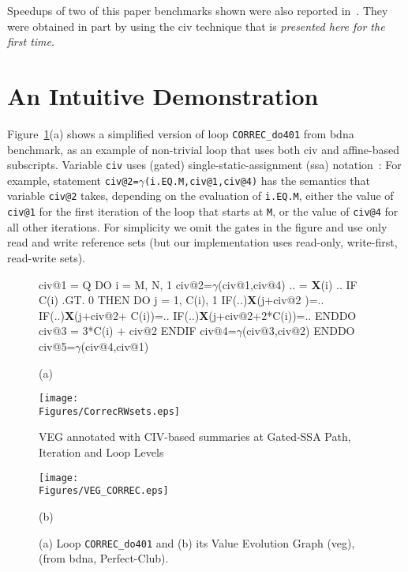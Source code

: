 \documentclass[10pt,nocopyrightspace]{sigplanconf}
\newcommand{\mymath}[1]{$ #1 $}
\newcommand{\Figures}[1]{../Figures/}
\begin{document}
Speedups of two of this paper benchmarks shown were also reported 
in~\cite{CosPLDI}. They were obtained in part by using the {\sc civ} 
technique that is {\em presented here for the first time}.


\section{An Intuitive Demonstration}
\label{Intro:RelAppLim}

Figure~\ref{fig:codeActforCorrec}(a) shows a simplified version of
loop {\tt CORREC\_do401} from {\sc bdna} benchmark, 
as an example of non-trivial loop that uses both {\sc civ} and affine-based
subscripts.   Variable {\tt civ}  uses (gated) 
single-static-assignment ({\sc ssa}) notation~\cite{GatedSSA}: 
%
For example, statement {\tt civ@2=$\gamma$(i.EQ.M,civ@1,civ@4)}
has the semantics that variable {\tt civ@2} takes, depending 
on the evaluation of {\tt i.EQ.M}, either the value of {\tt civ@1} for 
the first iteration of the loop that starts at {\tt M}, or the value of 
{\tt civ@4} for all other iterations. For simplicity we omit the gates 
in the figure and use only read and write reference sets
(but our implementation uses read-only, write-first, read-write sets).

\begin{figure}
\begin{minipage}{0.49\columnwidth}
\begin{colorcode}
civ@1 = Q
DO i = M, N, 1
 civ@2=\mymath{\gamma}(civ@1,civ@4)
 .. = {\bf X}(i) ..
 IF C(i) .GT. 0 THEN
  DO j = 1, C(i), 1
   IF(..){\bf{}X}(j+civ@2       )=..
   IF(..){\bf{}X}(j+civ@2+  C(i))=..
   IF(..){\bf{}X}(j+civ@2+2*C(i))=..
  ENDDO
  civ@3 = 3*C(i) + civ@2
 ENDIF
 civ@4=\mymath{\gamma}(civ@3,civ@2)
ENDDO
civ@5=\mymath{\gamma}(civ@4,civ@1)
  
            (a)
\end{colorcode}
\hspace{2ex}\texttt{[image: \\Figures/CorrecRWsets.eps]}
\end{minipage}
\begin{minipage}{0.45\columnwidth}
\begin{colorcode}
      VEG annotated with 
      CIV-based summaries 
      at Gated-SSA Path, 
         Iteration and 
         Loop Levels
\end{colorcode}
\texttt{[image: \\Figures/VEG\_CORREC.eps]}
\begin{colorcode}
                (b)
\end{colorcode}
\end{minipage}
\caption{(a) Loop {\tt CORREC\_do401} and (b) its Value Evolution Graph ({\sc veg}),
                (from {\sc bdna}, {\sc Perfect-Club}).}
\label{fig:codeActforCorrec}
\end{figure}
\end{document}

